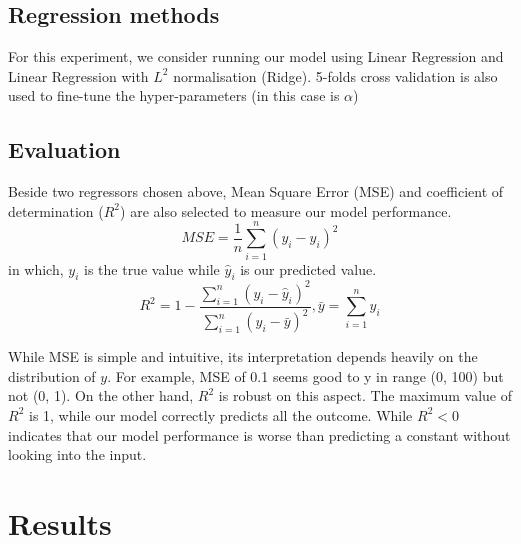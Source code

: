 \documentclass[12pt]{article}
\begin{document}
\subsection{Regression methods}
For this experiment, we consider running our model using Linear Regression and Linear Regression with $L^2$ normalisation (Ridge). 5-folds cross validation is also used to fine-tune the hyper-parameters (in this case is $\alpha$)

\subsection{Evaluation}
Beside two regressors chosen above, Mean Square Error (MSE) and coefficient of determination ($R^2$) are also selected to measure our model performance.
\[MSE=\frac{1}{n}\sum_{i=1}^{n}{(y_i-\hat{y}_i)^2}\]
in which, $y_i$ is the true value while $\hat{y}_i$ is our predicted value.
\[R^2=1-\frac{\sum_{i=1}^{n}{(y_i-\hat{y}_i)^2}}{\sum_{i=1}^{n}{(y_i-\bar{y})^2}}, \bar{y}=\sum_{i=1}^{n}y_i\]

While MSE is simple and intuitive, its interpretation depends heavily on the distribution of $y$. For example, MSE of 0.1 seems good to y in range (0, 100) but not (0, 1). On the other hand, $R^2$ is robust on this aspect. The maximum value of $R^2$ is 1, while our model correctly predicts all the outcome. While $R^2<0$ indicates that our model performance is worse than predicting a constant without looking into the input.

\section{Results} \label{results}
\end{document}
